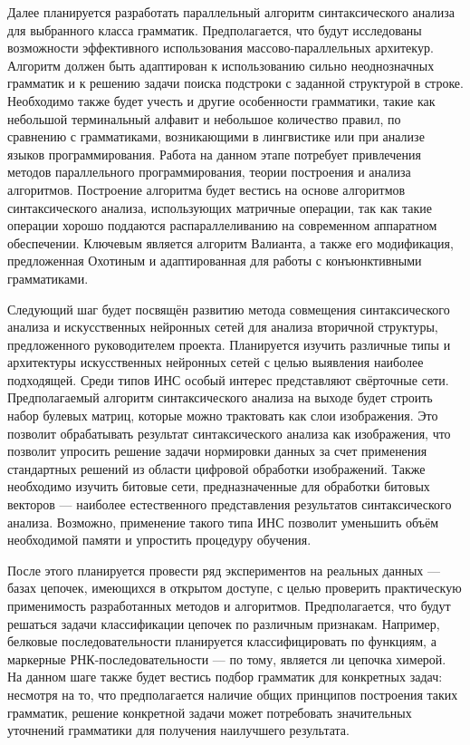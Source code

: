 \documentclass[12pt]{article}  %
\theoremstyle{remark}
\begin{document}
Далее планируется разработать параллельный алгоритм синтаксического анализа для выбранного класса грамматик.
Предполагается, что будут исследованы возможности эффективного использования массово-параллельных архитекур.
Алгоритм должен быть адаптирован к использованию сильно неоднозначных грамматик и к решению задачи поиска подстроки с заданной структурой в строке.
Необходимо также будет учесть и другие особенности грамматики, такие как небольшой терминальный алфавит и небольшое количество правил, по сравнению с грамматиками, возникающими в лингвистике или при анализе языков программирования.
Работа на данном этапе потребует привлечения методов параллельного программирования, теории построения и анализа алгоритмов.
Построение алгоритма будет вестись на основе алгоритмов синтаксического анализа, использующих матричные операции, так как такие операции хорошо поддаются распараллеливанию на современном аппаратном обеспечении.
Ключевым является алгоритм Валианта, а также его модификация, предложенная Охотиным и адаптированная для работы с конъюнктивными грамматиками.

Следующий шаг будет посвящён развитию метода совмещения синтаксического анализа и искусственных нейронных сетей для анализа вторичной структуры, предложенного руководителем проекта.
Планируется изучить различные типы и архитектуры искусственных нейронных сетей с целью выявления наиболее подходящей.
Среди типов ИНС особый интерес представляют свёрточные сети.
Предполагаемый алгоритм синтаксического анализа на выходе будет строить набор булевых матриц, которые можно трактовать как слои изображения.
Это позволит обрабатывать результат синтаксического анализа как изображения, что позволит упросить решение задачи нормировки данных за счет применения стандартных решений из области цифровой обработки изображений.
Также необходимо изучить битовые сети, предназначенные для обработки битовых векторов --- наиболее естественного представления результатов синтаксического анализа.
Возможно, применение такого типа ИНС позволит уменьшить объём необходимой памяти и упростить процедуру обучения.

После этого планируется провести ряд экспериментов на реальных данных --- базах цепочек, имеющихся в открытом доступе, с целью проверить практическую применимость разработанных методов и алгоритмов.
Предполагается, что будут решаться задачи классификации цепочек по различным признакам.
Например, белковые последовательности планируется классифицировать по функциям, а маркерные РНК-последовательности --- по тому, является ли цепочка химерой.
На данном шаге также будет вестись подбор грамматик для конкретных задач: несмотря на то, что предполагается наличие общих принципов построения таких грамматик, решение конкретной задачи может потребовать значительных уточнений грамматики для получения наилучшего результата.
\end{document}
